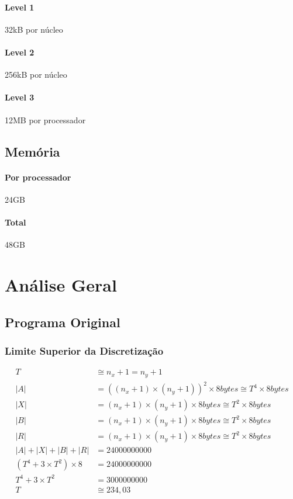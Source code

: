 \documentclass[12pt]{article}
\begin{document}
\paragraph{Level 1} 32kB por núcleo
\paragraph{Level 2} 256kB por núcleo
\paragraph{Level 3} 12MB por processador

\subsection{Memória}
\paragraph{Por processador} 24GB
\paragraph{Total} 48GB

\newpage


\newpage

\section{Análise Geral}

	\subsection{Programa Original}
	\subsubsection{Limite Superior da Discretização}

	\begin{align}
		T &\cong n_x + 1 = n_y + 1 \\
		|A| &= ((n_x+1)\times(n_y+1))^2\times8 bytes \cong T^4\times8 bytes \\
		|X| &= (n_x+1)\times(n_y+1)\times8 bytes \cong T^2\times8 bytes \\
		|B| &= (n_x+1)\times(n_y+1)\times8 bytes \cong T^2\times8 bytes \\
		|R| &= (n_x+1)\times(n_y+1)\times8 bytes \cong T^2\times8 bytes \\
		|A| + |X| + |B| + |R| &= 24000000000 \\
		(T^4 + 3\times T^2)\times8 &= 24000000000 \\
		T^4 + 3\times T^2 &= 3000000000 \\
		T &\cong 234,03
	\end{align}
\end{document}
